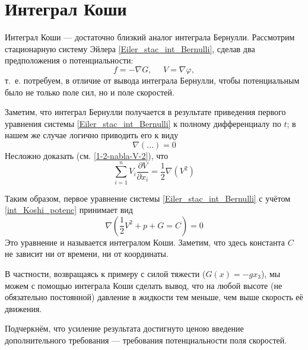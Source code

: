 \section{Интеграл Коши}

Интеграл Коши --- достаточно близкий аналог интеграла Бернулли.
Рассмотрим стационарную систему Эйлера \eqref{Eiler_stac_int_Bernulli},
сделав два предположения о потенциальности:
\begin{equation} \label{int_Koshi_potenc}
	f = -\nabla G,~~~~~~ V = \nabla \varphi,
\end{equation}
т.~е. потребуем, в отличие от вывода интеграла Бернулли,
чтобы потенциальным было не только поле сил, но и поле скоростей.

Заметим, что интеграл Бернулли получается в результате приведения первого уравнения системы
\eqref{Eiler_stac_int_Bernulli} к полному дифференциалу по $t$;
в нашем же случае логично приводить его к виду
$$
	\nabla(\dots) = 0
$$
Несложно доказать (см. \eqref{1-2-nabla-V-2}), что
$$
	\sum\limits_{i=1}^n V_i \frac{\partial V}{\partial x_i} = \frac{1}{2}\nabla(V^2)
$$

Таким образом, первое уравнение системы \eqref{Eiler_stac_int_Bernulli} с учётом \eqref{int_Koshi_potenc}
принимает вид
$$
	\nabla \left(
		\frac{1}{2}V^2 + p + G = C
	\right) = 0
$$
Это уравнение и называется интегралом Коши.
Заметим, что здесь константа $C$ не зависит ни от времени, ни от координаты.

В частности, возвращаясь к примеру с силой тяжести ($G(x) = -gx_3$),
мы можем с помощью интеграла Коши сделать вывод,
что на любой высоте (не обязательно постоянной) давление в жидкости тем меньше,
чем выше скорость её движения.

Подчеркнём, что усиление результата достигнуто ценою введение дополнительного требования ---
требования потенциальности поля скоростей.
